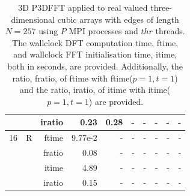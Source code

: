 \documentclass[a4paper]{article}
\begin{document}
\begin{table}[htbp]
\begin{center}
\begin{small}
\begin{tabular}{|r|r|r|r|r|r|r|r|r|r|}
             &             &  iratio &    0.23 &    0.28 &      - &      - &      - &      - &      - \\\hline
   16 &  R &   ftime &   9.77e-2 &      - &      - &      - &      - &      - &      - \\
             &             &  fratio &    0.08 &     - &      - &      - &      - &      - &      - \\
             &             &  itime &    4.89  &      - &      - &      - &      - &      - &      - \\
             &             &  iratio &    0.15 &      - &      - &      - &      - &      - &      - \\\hline

\end{tabular}
\caption{3D P3DFFT applied to real valued three-dimensional cubic arrays with edges of length $N=257$ using $P$ MPI processes and $thr$ threads. The wallclock DFT computation time, ftime, and wallclock FFT initialisation time, itime, both in seconds, are provided. Additionally, the ratio, fratio, of ftime  with ftime($p=1,t=1$) and the ratio, iratio, of itime  with itime($p=1,t=1$) are provided. }\label{TblP3DFFT3d257}
\end{small}
\end{center}
\end{table}
\end{document}
